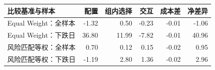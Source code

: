 \begin{tabular}{lrrrrr}
\toprule
比较基准与样本 & 配置 & 组内选择 & 交互 & 成本差 & 净差异\\\midrule
Equal Weight：全样本 & -1.32 & 0.50 & -0.23 & -0.01 & -1.06\\
Equal Weight：下跌日 & 36.80 & 11.99 & -7.82 & -0.01 & 40.96\\
风险匹配等权：全样本 & 0.70 & 0.12 & 0.15 & -0.02 & 0.95\\
风险匹配等权：下跌日 & -1.19 & 2.80 & 1.36 & -0.02 & 2.96\\
\bottomrule
\end{tabular}